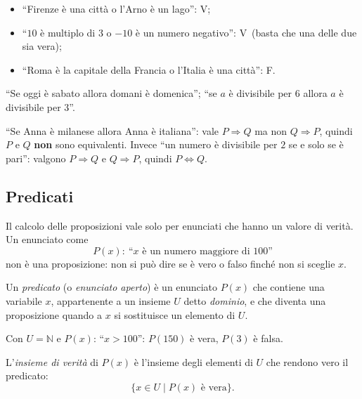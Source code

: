 \documentclass[11pt,a4paper]{article}
\newcommand{\V}{\textsf{V}}
\newcommand{\F}{\textsf{F}}
\begin{document}
\begin{esempio}[Disgiunzione]
\begin{itemize}
    \item ``Firenze è una città o l'Arno è un lago'': \V;
    \item ``$10$ è multiplo di $3$ o $-10$ è un numero negativo'': \V\ (basta che una delle due sia vera);
    \item ``Roma è la capitale della Francia o l'Italia è una città'': \F.
\end{itemize}
\end{esempio}

\begin{esempio}
``Se oggi è sabato allora domani è domenica''; ``se $a$ è divisibile per $6$ allora $a$ è divisibile per $3$''.

``Se Anna è milanese allora Anna è italiana'': vale $P \Rightarrow Q$ ma non $Q \Rightarrow P$, quindi $P$ e $Q$ \textbf{non} sono equivalenti. Invece ``un numero è divisibile per $2$ se e solo se è pari'': valgono $P \Rightarrow Q$ e $Q \Rightarrow P$, quindi $P \Leftrightarrow Q$.
\end{esempio}

\subsection{Predicati}

Il calcolo delle proposizioni vale solo per enunciati che hanno un valore
di verità. Un enunciato come
\[
P(x):\ \text{``$x$ è un numero maggiore di $100$''}
\]
non è una proposizione: non si può dire se è vero o falso finché non si
sceglie $x$.

\begin{definizione}
Un \emph{predicato} (o \emph{enunciato aperto}) è un enunciato $P(x)$ che
contiene una variabile $x$, appartenente a un insieme $U$ detto
\emph{dominio}, e che diventa una proposizione quando a $x$ si sostituisce
un elemento di $U$.
\end{definizione}

\begin{esempio}
Con $U = \mathbb{N}$ e $P(x)$: ``$x > 100$'': $P(150)$ è vera,
$P(3)$ è falsa.
\end{esempio}

\begin{definizione}
L'\emph{insieme di verità} di $P(x)$ è l'insieme degli elementi di $U$ che
rendono vero il predicato:
\[
\{x \in U \mid P(x) \text{ è vera}\}.
\]
\end{definizione}
\end{document}
